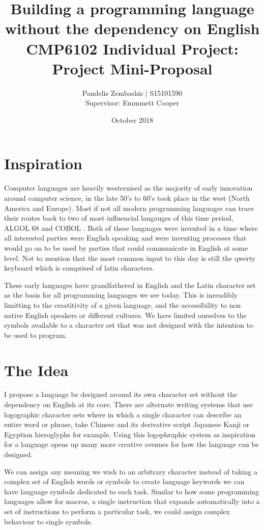 \documentclass[12pt]{article}
\title{%
  Building a programming language without the dependency on English \\
  \large CMP6102 Individual Project:
 Project Mini-Proposal }
\author{Pandelis Zembashis | S15101590 \\ 
Supervisor: Emmmett Cooper}
\date{October 2018}
\begin{document}
\maketitle

\section{Inspiration}

Computer languages are heavily westernised as the majority of 
early innovation around computer science, in the late 50's to 60's 
took place in the west (North America and Europe). Most if not all
modern programming languages can trace their routes back to two of
most influencial langauges of this time period, ALGOL 68 and COBOL 
\parencite{5396281}. Both of these languages were invented in a time
where all interested parties were English speaking and were inventing
processes that would go on to be used by parties that could communicate
in English at some level. Not to mention that the most common input to this
day is still the qwerty keyboard which is comprised of latin characters.

These early languages have grandfathered in English and the Latin 
character set as the basis for all programming languages we see today. 
This is inreadibly limitting to the creatitivity of a given language,
and the accessibility to non native English speakers or different cultures. 
We have limited ourselves to the symbols available to a character set that was not designed with the intention
to be used to program.

\section{The Idea}

I propose a language be designed around its own character set without the dependency on English at its core.
There are alternate writing systems that use logographic character sets where in which a single
character can describe an entire word or phrase, take Chinese and its derivative script Japanese Kanji or Egyption hieroglyphs for example.
Using this logophraphic system as inspiration for a language opens up many more creative
avenues for how the language can be designed. 

We can assign any meaning we wish to an arbitrary character
instead of taking a complex set of English words or symbols to create language keywords we can have language symbols dedicated to each task.
Similar to how some programming languages allow for macros, a single instruction that expands automatically into a set of instructions to perform a particular task,
we could assign complex behaviour to single symbols.
\end{document}
